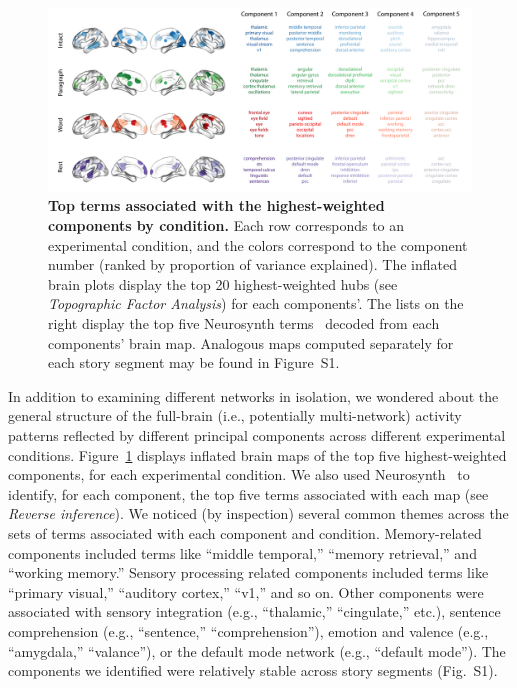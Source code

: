 \documentclass[english, 11pt]{article}
\newcommand{\synthThirds}{S1}
\begin{document}
\begin{figure}[tp]
  \centering
  \includegraphics[width=\textwidth]{figs/pca_neurosynth}

\caption{\textbf{Top terms associated with the highest-weighted components by
condition.} Each row corresponds to an experimental condition, and the colors
correspond to the component number (ranked by proportion of variance
explained). The inflated brain plots display the top 20 highest-weighted hubs
(see \textit{Topographic Factor Analysis}) for each components'. The lists on
the right display the top five Neurosynth terms~\citep{RubiEtal17} decoded from
each components' brain map. Analogous maps computed separately for each story
segment may be found in Figure~\synthThirds.}

\label{fig:neurosynth-pca}

\end{figure}

In addition to examining different networks in isolation, we wondered about the
general structure of the full-brain (i.e., potentially multi-network) activity
patterns reflected by different principal components across different
experimental conditions. Figure~\ref{fig:neurosynth-pca} displays inflated
brain maps of the top five highest-weighted components, for each experimental
condition. We also used Neurosynth~\citep{RubiEtal17} to identify, for each
component, the top five terms associated with each map (see \textit{Reverse
inference}). We noticed (by inspection) several common themes across the sets
of terms associated with each component and condition. Memory-related
components included terms like ``middle temporal,'' ``memory retrieval,'' and
``working memory.'' Sensory processing related components included terms like
``primary visual,'' ``auditory cortex,'' ``v1,'' and so on. Other components
were associated with sensory integration (e.g., ``thalamic,'' ``cingulate,''
etc.), sentence comprehension (e.g., ``sentence,'' ``comprehension''), emotion
and valence (e.g., ``amygdala,'' ``valance''), or the default mode network
(e.g., ``default mode'').  The components we identified were relatively stable
across story segments (Fig.~\synthThirds).
\end{document}
